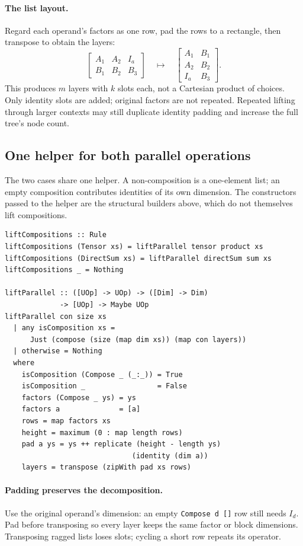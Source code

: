 \documentclass[11pt,a4paper]{article}
\newcommand{\code}[1]{\texttt{#1}}
\begin{document}
\paragraph{The list layout.}
Regard each operand's factors as one row, pad the rows to a rectangle,
then transpose to obtain the layers:
\[
 \begin{bmatrix} A_1&A_2&I_a\\ B_1&B_2&B_3\end{bmatrix}
 \quad\longmapsto\quad
 \begin{bmatrix} A_1&B_1\\ A_2&B_2\\ I_a&B_3\end{bmatrix}.
\]
This produces $m$ layers with $k$ slots each, not a Cartesian product
of choices. Only identity slots are added; original factors are not
repeated. Repeated lifting through larger contexts may still duplicate
identity padding and increase the full tree's node count.

\subsection{One helper for both parallel operations}

The two cases share one helper. A non-composition is a one-element list;
an empty composition contributes identities of its own dimension.
The constructors passed to the helper are the structural builders above,
which do not themselves lift compositions.

\begin{lstlisting}
liftCompositions :: Rule
liftCompositions (Tensor xs) = liftParallel tensor product xs
liftCompositions (DirectSum xs) = liftParallel directSum sum xs
liftCompositions _ = Nothing

liftParallel :: ([UOp] -> UOp) -> ([Dim] -> Dim)
             -> [UOp] -> Maybe UOp
liftParallel con size xs
  | any isComposition xs =
      Just (compose (size (map dim xs)) (map con layers))
  | otherwise = Nothing
  where
    isComposition (Compose _ (_:_)) = True
    isComposition _                 = False
    factors (Compose _ ys) = ys
    factors a              = [a]
    rows = map factors xs
    height = maximum (0 : map length rows)
    pad a ys = ys ++ replicate (height - length ys)
                              (identity (dim a))
    layers = transpose (zipWith pad xs rows)
\end{lstlisting}

\paragraph{Padding preserves the decomposition.}
Use the original operand's dimension: an empty \code{Compose d []}
row still needs $I_d$. Pad before transposing so every layer keeps the
same factor or block dimensions. Transposing ragged lists loses slots;
cycling a short row repeats its operator.
\end{document}
